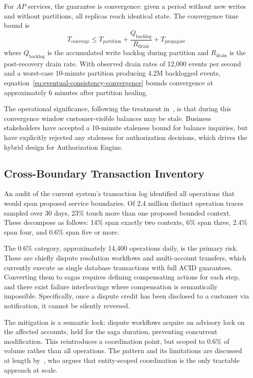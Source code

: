 For $AP$ services, the guarantee is convergence: given a period without new writes and without partitions, all replicas reach identical state. The convergence time bound is
\begin{equation}
\label{eq:eventual-consistency-convergence}
T_{\text{converge}} \leq T_{\text{partition}} + \frac{Q_{\text{backlog}}}{R_{\text{drain}}} + T_{\text{propagate}}
\end{equation}
where $Q_{\text{backlog}}$ is the accumulated write backlog during partition and $R_{\text{drain}}$ is the post-recovery drain rate. With observed drain rates of 12,000 events per second and a worst-case 10-minute partition producing 4.2M backlogged events, equation~\eqref{eq:eventual-consistency-convergence} bounds convergence at approximately 6 minutes after partition healing.

The operational significance, following the treatment in~\cite{vogels-eventual-consistency-2009}, is that during this convergence window customer-visible balances may be stale. Business stakeholders have accepted a 10-minute staleness bound for balance inquiries, but have explicitly rejected any staleness for authorization decisions, which drives the hybrid design for Authorization Engine.

\subsection{Cross-Boundary Transaction Inventory}

An audit of the current system's transaction log identified all operations that would span proposed service boundaries. Of 2.4 million distinct operation traces sampled over 30 days, 23\% touch more than one proposed bounded context. These decompose as follows: 14\% span exactly two contexts, 6\% span three, 2.4\% span four, and 0.6\% span five or more.

The 0.6\% category, approximately 14,400 operations daily, is the primary risk. These are chiefly dispute resolution workflows and multi-account transfers, which currently execute as single database transactions with full ACID guarantees. Converting them to sagas requires defining compensating actions for each step, and there exist failure interleavings where compensation is semantically impossible. Specifically, once a dispute credit has been disclosed to a customer via notification, it cannot be silently reversed.

The mitigation is a semantic lock: dispute workflows acquire an advisory lock on the affected accounts, held for the saga duration, preventing concurrent modification. This reintroduces a coordination point, but scoped to 0.6\% of volume rather than all operations. The pattern and its limitations are discussed at length by~\cite{helland-life-beyond-2007}, who argues that entity-scoped coordination is the only tractable approach at scale.

